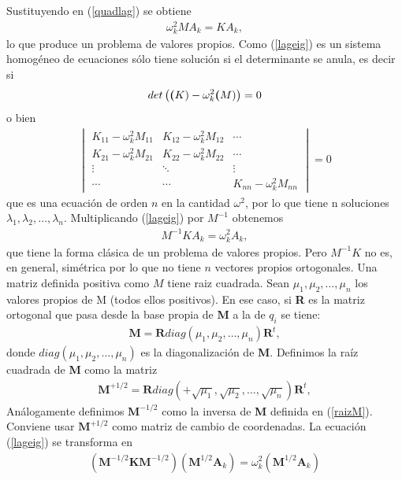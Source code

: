 \documentclass[letterpaper,12pt,oneside]{book}
\begin{document}
%
Sustituyendo en (\ref{quadlag}) se obtiene 
%
\begin{eqnarray}
\omega_k^2 MA_k=KA_k \label{lageig},
\end{eqnarray}
%
lo que produce un problema de valores propios. Como (\ref{lageig}) es un sistema homog\'eneo de ecuaciones s\'olo tiene soluci\'on si el determinante se anula, es decir si
%
\begin{eqnarray}
det\left(\textbf(K)-\omega_k^2\textbf(M)\right)=0
\end{eqnarray}
%
o bien
%
\begin{eqnarray}
\begin{vmatrix}
K_{11} -\omega_k^2M_{11}& K_{12} -\omega_k^2M_{12}&\cdots\\
K_{21} -\omega_k^2M_{21}& K_{22} -\omega_k^2M_{22}&\cdots\\
\vdots& \ddots& \vdots\\
\cdots& \cdots& K_{nn} -\omega_k^2M_{nn}
\end{vmatrix}=0
\end{eqnarray}
%
que es una ecuaci\'on de orden $n$ en la cantidad $\omega^2$, por lo que tiene n soluciones $\lambda_1, \lambda_2,\dots,\lambda_n$. Multiplicando (\ref{lageig}) por $M^{-1}$ obtenemos 
%
\begin{eqnarray}
M^{-1}KA_k=\omega^2_kA_k,
\end{eqnarray}
%
que tiene la forma cl\'asica de un problema de valores propios. Pero $M^{-1}K$ no es, en general, sim\'etrica por lo que no tiene $n$ vectores propios ortogonales. Una matriz definida positiva como $M$ tiene raiz cuadrada. Sean $\mu_1,\mu_2,\dots,\mu_n$ los valores propios de M (todos ellos positivos). En ese caso, si \textbf{R} es la matriz ortogonal que pasa desde la base propia de \textbf{M} a la de $q_i$ se tiene:
%
\begin{eqnarray}
\textbf{M} = \textbf{R} diag(\mu_1,\mu_2,\dots,\mu_n)\textbf{R}^t,
\end{eqnarray}
%
donde $diag(\mu_1,\mu_2,\dots,\mu_n)$ es la diagonalizaci\'on de \textbf{M}. Definimos la ra\'iz cuadrada de \textbf{M} como la matriz
%
\begin{eqnarray}
\textbf{M}^{+1/2} = \textbf{R} diag(+\sqrt{\mu_1},\sqrt{\mu_2},\dots,\sqrt{\mu_n})\textbf{R}^t,\label{raizM}
\end{eqnarray}
%
An\'alogamente definimos $\textbf{M}^{-1/2}$ como la inversa de \textbf{M} definida en (\ref{raizM}). Conviene usar $\textbf{M}^{+1/2}$ como matriz de cambio de coordenadas. La ecuaci\'on (\ref{lageig}) se transforma en 
%
\begin{eqnarray}
\left(\textbf{M}^{-1/2}\textbf{K}\textbf{M}^{-1/2}\right)\left(\textbf{M}^{1/2}\textbf{A}_k\right)=\omega_k^2\left(\textbf{M}^{1/2}\textbf{A}_k\right)
\end{eqnarray}
\end{document}

